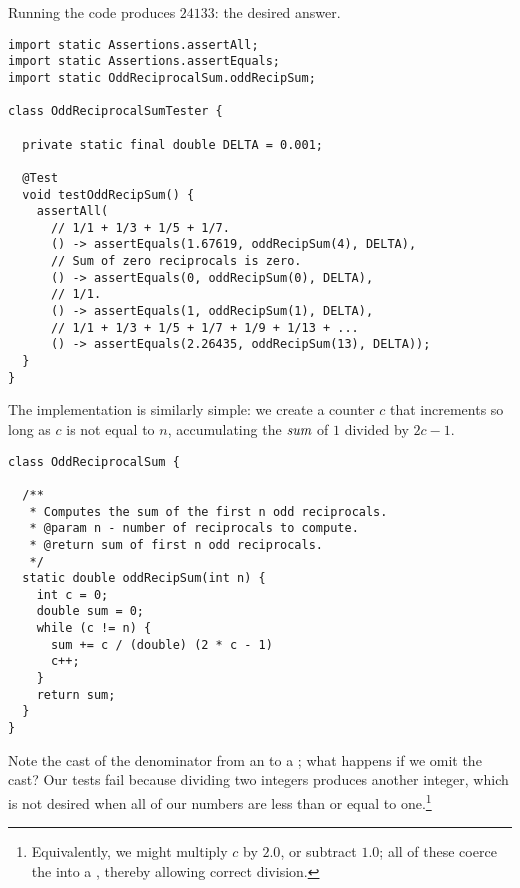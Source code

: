 Running the code produces $24133$: the desired answer.


\begin{lstlisting}[language=MyJava]
import static Assertions.assertAll;
import static Assertions.assertEquals;
import static OddReciprocalSum.oddRecipSum;

class OddReciprocalSumTester {

  private static final double DELTA = 0.001;

  @Test
  void testOddRecipSum() {
    assertAll(
      // 1/1 + 1/3 + 1/5 + 1/7.
      () -> assertEquals(1.67619, oddRecipSum(4), DELTA),
      // Sum of zero reciprocals is zero.
      () -> assertEquals(0, oddRecipSum(0), DELTA),
      // 1/1.
      () -> assertEquals(1, oddRecipSum(1), DELTA),
      // 1/1 + 1/3 + 1/5 + 1/7 + 1/9 + 1/13 + ...
      () -> assertEquals(2.26435, oddRecipSum(13), DELTA));
  }
}
\end{lstlisting}

The implementation is similarly simple: we create a counter $c$ that increments so long as $c$ is not equal to $n$, accumulating the $\emph{sum}$ of $1$ divided by $2c-1$.

\begin{lstlisting}[language=MyJava]
class OddReciprocalSum {

  /**
   * Computes the sum of the first n odd reciprocals.
   * @param n - number of reciprocals to compute.
   * @return sum of first n odd reciprocals.
   */
  static double oddRecipSum(int n) {
    int c = 0;
    double sum = 0;
    while (c != n) {
      sum += c / (double) (2 * c - 1)
      c++;
    }
    return sum;
  }
}
\end{lstlisting}

Note the cast of the denominator from an  to a ; what happens if we omit the cast? Our tests fail because dividing two integers produces another integer, which is not desired when all of our numbers are less than or equal to one.\footnote{Equivalently, we might multiply $c$ by $2.0$, or subtract $1.0$; all of these coerce the  into a , thereby allowing correct division.}


